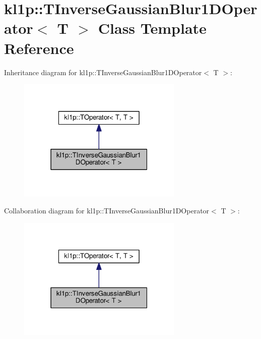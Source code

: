 \hypertarget{classkl1p_1_1TInverseGaussianBlur1DOperator}{}\section{kl1p\+:\+:T\+Inverse\+Gaussian\+Blur1\+D\+Operator$<$ T $>$ Class Template Reference}
\label{classkl1p_1_1TInverseGaussianBlur1DOperator}


Inheritance diagram for kl1p\+:\+:T\+Inverse\+Gaussian\+Blur1\+D\+Operator$<$ T $>$\+:
\nopagebreak
\begin{figure}[H]
\begin{center}
\leavevmode
\includegraphics[width=223pt]{classkl1p_1_1TInverseGaussianBlur1DOperator__inherit__graph}
\end{center}
\end{figure}


Collaboration diagram for kl1p\+:\+:T\+Inverse\+Gaussian\+Blur1\+D\+Operator$<$ T $>$\+:
\nopagebreak
\begin{figure}[H]
\begin{center}
\leavevmode
\includegraphics[width=223pt]{classkl1p_1_1TInverseGaussianBlur1DOperator__coll__graph}
\end{center}
\end{figure}
